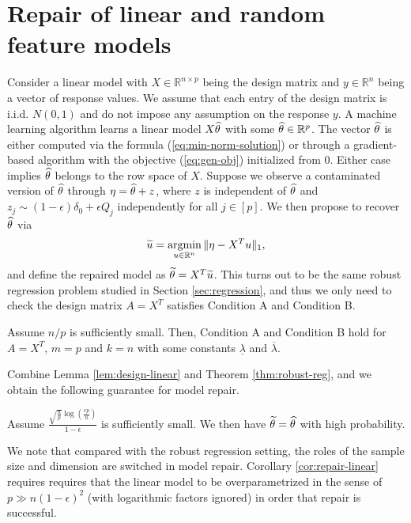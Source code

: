 


\section{Repair of linear and random feature models}
\label{sec:linear}

Consider a linear model with $X\in\mathbb{R}^{n\times p}$ being the design matrix and $y\in\mathbb{R}^n$ being a vector of response values. We assume that each entry of the design matrix is i.i.d. $N(0,1)$ and do not impose any assumption on the response $y$. A machine learning algorithm learns a linear model $X\widehat{\theta}$ with some $\widehat{\theta}\in\mathbb{R}^{p}$. The vector $\widehat{\theta}$ is either computed via the formula (\ref{eq:min-norm-solution}) or through a gradient-based algorithm with the objective (\ref{eq:gen-obj}) initialized from $0$. Either case implies $\widehat{\theta}$ belongs to the row space of $X$. Suppose we observe a contaminated version of $\widehat{\theta}$ through $
\eta=\widehat{\theta}+z$, where $z$ is independent of $\widehat{\theta}$ and $z_j\sim (1-\epsilon)\delta_0+\epsilon Q_j$ independently for all $j\in[p]$. We then propose to recover $\widehat{\theta}$ via
$$\widetilde{u}=\mathop{\rm argmin}_{u\in\mathbb{R}^n}\|\eta-X^Tu\|_1,$$
and define the repaired model as $\widetilde{\theta}=X^T\widetilde{u}$. This turns out to be the same robust regression problem studied in Section \ref{sec:regression}, and thus we only need to check the design matrix $A=X^T$ satisfies Condition A and Condition B.
\begin{lemma}\label{lem:design-linear}
Assume $n/p$ is sufficiently small. Then, Condition A and Condition B hold for $A=X^T$, $m=p$ and $k=n$ with some constants $\underline{\lambda}$ and $\overline{\lambda}$.
\end{lemma}
Combine Lemma \ref{lem:design-linear} and Theorem \ref{thm:robust-reg}, and we obtain the following guarantee for model repair.
\begin{corollary}\label{cor:repair-linear}
Assume $\frac{\sqrt{\frac{n}{p}}\log\left(\frac{ep}{n}\right)}{1-\epsilon}$ is sufficiently small. We then have $\widetilde{\theta}=\widehat{\theta}$ with high probability.
\end{corollary}

We note that compared with the robust regression setting, the roles of the sample size and dimension are switched in model repair. Corollary \ref{cor:repair-linear} requires requires that the linear model to be overparametrized in the sense of $p\gg n(1-\epsilon)^2$ (with logarithmic factors ignored) in order that repair is successful. 

